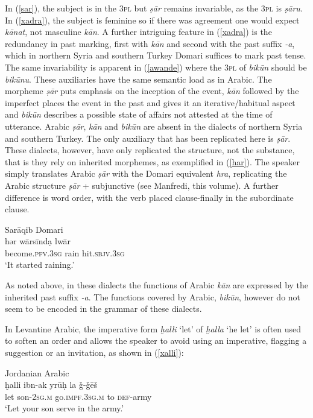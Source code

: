 \documentclass[output=paper]{langsci/langscibook}
\begin{document}
In (\ref{sar}), the subject is in the 3\textsc{pl} but \textit{ṣār} remains invariable, as the \textsc{3pl} is \textit{ṣāru}. In (\ref{xadra}), the subject is feminine so if there was agreement one would expect \textit{kānat}, not masculine \textit{kān}. A further intriguing feature in (\ref{xadra}) is the redundancy in past marking, first with \textit{kān} and second with the past suffix \textit{{}-a}, which in northern Syria and southern Turkey Domari suffices to mark past tense. The same invariability is apparent in (\ref{awande}) where the \textsc{3pl} of \textit{bikūn} should be \textit{bikūnu}. These auxiliaries have the same semantic load as in Arabic. The morpheme \textit{ṣār} puts emphasis on the inception of the event, \textit{kān} followed by the imperfect places the event in the past and gives it an iterative/habitual aspect and \textit{bikūn} describes a possible state of affairs not attested at the time of utterance. Arabic \textit{ṣār}, \textit{kān} and \textit{bikūn} are absent in the dialects of northern Syria and southern Turkey. The only auxiliary that has been replicated here is \textit{ṣār}. These dialects, however, have only replicated the structure, not the substance, that is they rely on inherited morphemes, as exemplified in (\ref{har}). The speaker simply translates Arabic \textit{ṣār} with the Domari equivalent \textit{hra}, replicating the Arabic structure \textit{ṣār} + subjunctive (see Manfredi, this volume). A further difference is word order, with the verb placed clause-finally in the subordinate clause. 

\ea\label{ex:key:} \label{har}
{Sarāqib Domari}\\
\gll hər wārsīndạ lwār\\
     become.\textsc{pfv.3sg} rain hit.\textsc{sbjv.3sg}\\
\glt ‘It started raining.’
\z

As noted above, in these dialects the functions of Arabic \textit{kān} are expressed by the inherited past suffix \textit{-a}. The functions covered by Arabic, \textit{bikūn}, however do not seem to be encoded in the grammar of these dialects.

In Levantine Arabic, the imperative form \textit{ḫalli} ‘let’ of \textit{ḫalla} ‘he let’ is often used to soften an order and allows the speaker to avoid using an imperative, flagging a suggestion or an invitation, as shown in (\ref{xalli}):

\ea\label{ex:key:} \label{xalli}
{Jordanian Arabic}\\
\gll ḫalli ibn-ak yrūḥ la \v{g}-\v{g}ēš\\
     let son-\textsc{2sg.m} go.\textsc{impf.3sg.m} to \textsc{def}{}-army\\
\glt ‘Let your son serve in the army.’
\z
\end{document}
